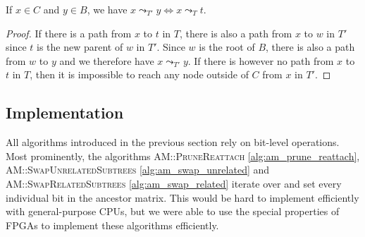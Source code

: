 \begin{lemma}
    \label{lem:related_swap_cb}
    If $x \in C$ and $y \in B$, we have $x \leadsto_{T'} y \Leftrightarrow x \leadsto_T t$.
\end{lemma}

\begin{proof}
    If there is a path from $x$ to $t$ in $T$, there is also a path from $x$ to $w$ in $T'$ since $t$ is the new parent of $w$ in $T'$. Since $w$ is the root of $B$, there is also a path from $w$ to $y$ and we therefore have $x \leadsto_{T'} y$. If there is however no path from $x$ to $t$ in $T$, then it is impossible to reach any node outside of $C$ from $x$ in $T'$.
\end{proof}

\subsection{Implementation}
\label{sec:encoding_implementation}

All algorithms introduced in the previous section rely on bit-level operations. Most prominently, the algorithms \textsc{AM::PruneReattach} \ref{alg:am_prune_reattach}, \textsc{AM::SwapUnrelatedSubtrees} \ref{alg:am_swap_unrelated} and \textsc{AM::SwapRelatedSubtrees} \ref{alg:am_swap_related} iterate over and set every individual bit in the ancestor matrix. This would be hard to implement efficiently with general-purpose \acp{CPU}, but we were able to use the special properties of \acp{FPGA} to implement these algorithms efficiently.

